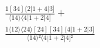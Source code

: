 \documentclass[varwidth, border=5pt]{standalone}
\begin{document}
\begin{my}
$\begin{gathered}
\scriptscriptstyle\frac{1[34]⟨2|1+4|3]}{⟨14⟩⟨4|1+2|4]} +\\
\scriptscriptstyle\frac{1⟨12⟩⟨24⟩[24][34]⟨4|1+2|3]}{⟨14⟩²⟨4|1+2|4]²} \phantom{+}
\end{gathered}$
\end{my}
\end{document}
